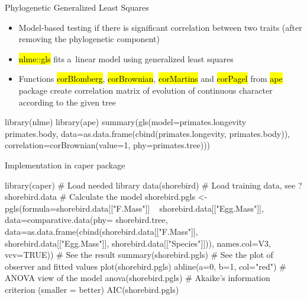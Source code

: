 \documentclass[compress, ucs, xelatex, 11pt, xcolor=svgnames,
	hyperref={
		bookmarks=true,
		unicode=true,
		colorlinks=true,
		pdftitle={Molecular data in R},
		plainpages=false,
		pdfauthor={Vojtech Zeisek},
		pdfsubject={Course about phylogeny and evolution in R},
		pdfcreator={XeLaTeX},
		pdfkeywords={R, evolution, phylogeny, molecular data},
		linkcolor=Tomato,
		anchorcolor=SaddleBrown,
		citecolor=Goldenrod,
		filecolor=DarkMagenta,
		menucolor=Sienna,
		urlcolor=DarkTurquoise,
		pdftex},
	url={hyphens, lowtilde} %
	]{beamer}
\renewcommand{\texttt}[1]{\hl{\ttfamily #1}}
\begin{document}
\begin{frame}[fragile]{Phylogenetic Generalized Least Squares}
	\begin{itemize}
		\item Model-based testing if there is significant correlation between two traits (after removing the phylogenetic component)
		\item \texttt{nlme::gls} fits a~linear model using generalized least squares
		\item Functions \texttt{corBlomberg}, \texttt{corBrownian}, \texttt{corMartins} and \texttt{corPagel} from \texttt{ape} package create correlation matrix of evolution of continuous character according to the given tree
	\end{itemize}
	\begin{spluscode}
    library(nlme)
    library(ape)
    summary(gls(model=primates.longevity ~ primates.body,
      data=as.data.frame(cbind(primates.longevity, primates.body)),
      correlation=corBrownian(value=1, phy=primates.tree)))
	\end{spluscode}
\end{frame}

\begin{frame}[fragile]{Implementation in caper package}
	\begin{spluscode}
    library(caper) # Load needed library
    data(shorebird) # Load training data, see ?shorebird.data
    # Calculate the model
    shorebird.pgls <- pgls(formula=shorebird.data[["F.Mass"]] ~
      shorebird.data[["Egg.Mass"]], data=comparative.data(phy=
      shorebird.tree, data=as.data.frame(cbind(shorebird.data[["F.Mass"]],
      shorebird.data[["Egg.Mass"]], shorebird.data[["Species"]])),
      names.col=V3, vcv=TRUE))
    # See the result
    summary(shorebird.pgls)
    # See the plot of observer and fitted values
    plot(shorebird.pgls)
    abline(a=0, b=1, col="red")
    # ANOVA view of the model
    anova(shorebird.pgls)
    # Akaike's information criterion (smaller = better)
    AIC(shorebird.pgls)
	\end{spluscode}
\end{frame}
\end{document}
